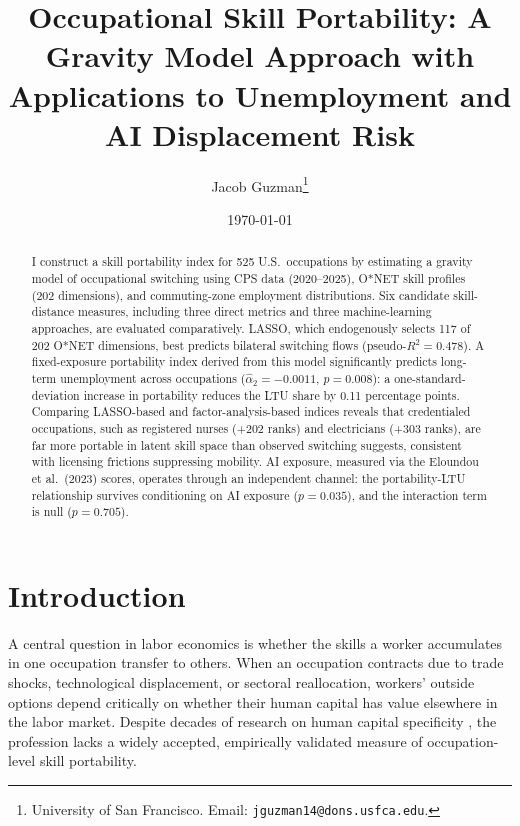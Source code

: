 \documentclass[12pt]{article}
\title{Occupational Skill Portability: A Gravity Model Approach with Applications to Unemployment and AI Displacement Risk}
\author{Jacob Guzman\thanks{University of San Francisco. Email: \texttt{jguzman14@dons.usfca.edu}.}}
\date{\today}
\begin{document}
\maketitle

\begin{abstract}
I construct a skill portability index for 525 U.S.\ occupations by estimating a gravity model of occupational switching using CPS data (2020--2025), O*NET skill profiles (202 dimensions), and commuting-zone employment distributions. Six candidate skill-distance measures, including three direct metrics and three machine-learning approaches, are evaluated comparatively. LASSO, which endogenously selects 117 of 202 O*NET dimensions, best predicts bilateral switching flows (pseudo-$R^2 = 0.478$). A fixed-exposure portability index derived from this model significantly predicts long-term unemployment across occupations ($\hat{\alpha}_2 = -0.0011$, $p = 0.008$): a one-standard-deviation increase in portability reduces the LTU share by 0.11 percentage points. Comparing LASSO-based and factor-analysis-based indices reveals that credentialed occupations, such as registered nurses (+202 ranks) and electricians (+303 ranks), are far more portable in latent skill space than observed switching suggests, consistent with licensing frictions suppressing mobility. AI exposure, measured via the Eloundou et al.\ (2023) scores, operates through an independent channel: the portability-LTU relationship survives conditioning on AI exposure ($p = 0.035$), and the interaction term is null ($p = 0.705$).
\end{abstract}

\section{Introduction}
\label{sec:intro}

A central question in labor economics is whether the skills a worker accumulates in one occupation transfer to others. When an occupation contracts due to trade shocks, technological displacement, or sectoral reallocation, workers' outside options depend critically on whether their human capital has value elsewhere in the labor market. Despite decades of research on human capital specificity \citep{becker1964,lazear2009}, the profession lacks a widely accepted, empirically validated measure of occupation-level skill portability.
\end{document}
